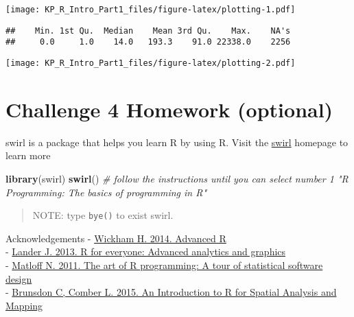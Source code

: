 \documentclass[]{article}
\newenvironment{Shaded}{\begin{snugshade}}{\end{snugshade}}
\newcommand{\KeywordTok}[1]{\textcolor[rgb]{0.13,0.29,0.53}{\textbf{#1}}}
\newcommand{\CommentTok}[1]{\textcolor[rgb]{0.56,0.35,0.01}{\textit{#1}}}
\newcommand{\OperatorTok}[1]{\textcolor[rgb]{0.81,0.36,0.00}{\textbf{#1}}}
\newcommand{\NormalTok}[1]{#1}
\begin{document}
\texttt{[image: KP\_R\_Intro\_Part1\_files/figure-latex/plotting-1.pdf]}

\begin{Shaded}
\end{Shaded}

\begin{verbatim}
##    Min. 1st Qu.  Median    Mean 3rd Qu.    Max.    NA's 
##     0.0     1.0    14.0   193.3    91.0 22338.0    2256
\end{verbatim}

\begin{Shaded}
\end{Shaded}

\texttt{[image: KP\_R\_Intro\_Part1\_files/figure-latex/plotting-2.pdf]}

\section{\texorpdfstring{\textbf{Challenge 4} Homework
(optional)}{Challenge 4 Homework (optional)}}\label{challenge-4-homework-optional}

swirl is a package that helps you learn R by using R. Visit the
\href{http://swirlstats.com/}{swirl} homepage to learn more

\begin{Shaded}
\begin{Highlighting}[]
\KeywordTok{library}\NormalTok{(swirl)}
\KeywordTok{swirl}\NormalTok{()}
\CommentTok{# follow the instructions until you can select number 1 "R Programming: The basics of programming in R"}
\end{Highlighting}
\end{Shaded}

\begin{quote}
NOTE: type \texttt{bye()} to exist swirl.
\end{quote}

Acknowledgements - \href{http://adv-r.had.co.nz/}{Wickham H. 2014.
Advanced R}\\
- \href{http://www.jaredlander.com/r-for-everyone/}{Lander J. 2013. R
for everyone: Advanced analytics and graphics}\\
- \href{https://www.nostarch.com/artofr.htm}{Matloff N. 2011. The art of
R programming: A tour of statistical software design}\\
-
\href{https://us.sagepub.com/en-us/nam/an-introduction-to-r-for-spatial-analysis-and-mapping/book241031}{Brunsdon
C, Comber L. 2015. An Introduction to R for Spatial Analysis and
Mapping}
\end{document}
